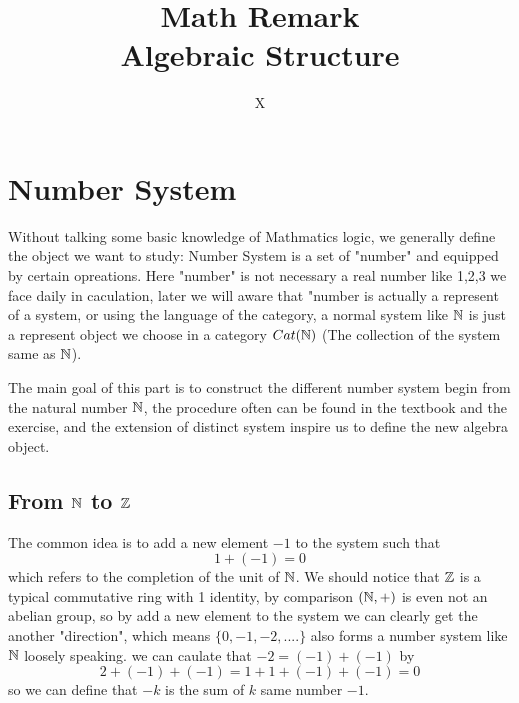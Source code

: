 \documentclass[en,geye,blue,pc,12pt]{elegantnote}
\title{Math Remark
\\ Algebraic Structure
}
\author{X}
\institute{Elegant\LaTeX{} Program}
\begin{document}
\maketitle

\newpage

\tableofcontents

\newpage

\section{Number System}
Without talking some basic knowledge of Mathmatics logic, we generally define the object we want to study: Number System is a set of "number" and equipped by certain opreations. Here "number" is not necessary a real number like 1,2,3 we face daily in caculation, later we will aware that "number is actually a represent of a system, or using the language of the category, a normal system like \(\mathbb{N}\) is just a represent object we choose in a category \(Cat(\mathbb{N})\) (The collection of the system same as \(\mathbb{N}\)).

The main goal of this part is to construct the different number system begin from the natural number \(\mathbb{N}\), the procedure often can be found in the textbook and the exercise, and the extension of distinct system inspire us to define the new algebra object.

\subsection{From \texorpdfstring{$\mathbb{N}$}{TEXT} to \texorpdfstring{$\mathbb{Z}$}{TEXT} }
The common idea is to add a new element \(-1\) to the system such that 
\[1+(-1)=0\]
which refers to the completion of the unit of \(\mathbb{N}\). We should notice that \(\mathbb{Z}\) is a typical commutative ring with 1 identity, by comparison \((\mathbb{N},+)\) is even not an abelian group, so by add a new element to the system we can clearly get the another "direction", which means \(\{0,-1,-2,....\}\) also forms a number system like \(\mathbb{N}\) loosely speaking. we can caulate that \(-2=(-1)+(-1)\) by 
\[2+(-1)+(-1)=1+1+(-1)+(-1)=0\]
so we can define that \(-k\) is the sum of \(k\) same number \(-1\). 
\end{document}
